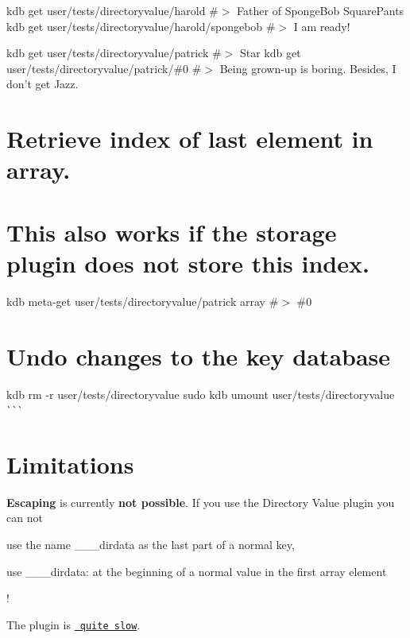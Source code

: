 kdb get user/tests/directoryvalue/harold \#$>$ Father of Sponge\+Bob Square\+Pants kdb get user/tests/directoryvalue/harold/spongebob \#$>$ I am ready!

kdb get user/tests/directoryvalue/patrick \#$>$ Star kdb get user/tests/directoryvalue/patrick/\#0 \#$>$ Being grown-\/up is boring. Besides, I don’t get Jazz.\hypertarget{autotoc_md181_autotoc_md192}{}\section{Retrieve index of last element in array.}\label{autotoc_md181_autotoc_md192}
\hypertarget{autotoc_md181_autotoc_md193}{}\section{This also works if the storage plugin does not store this index.}\label{autotoc_md181_autotoc_md193}
kdb meta-\/get user/tests/directoryvalue/patrick array \#$>$ \#0\hypertarget{autotoc_md181_autotoc_md194}{}\section{Undo changes to the key database}\label{autotoc_md181_autotoc_md194}
kdb rm -\/r user/tests/directoryvalue sudo kdb umount user/tests/directoryvalue \`{}\`{}\`{}\hypertarget{autotoc_md181_autotoc_md195}{}\section{Limitations}\label{autotoc_md181_autotoc_md195}

\begin{DoxyItemize}
\item {\bfseries{Escaping}} is currently {\bfseries{not possible}}. If you use the Directory Value plugin you can not
\begin{DoxyItemize}
\item use the name {\ttfamily \+\_\+\+\_\+\+\_\+dirdata} as the last part of a normal key,
\item use {\ttfamily \+\_\+\+\_\+\+\_\+dirdata\+:} at the beginning of a normal value in the first array element
\end{DoxyItemize}

!
\item The plugin is \href{https://issues.libelektra.org/2281}{\texttt{ quite slow}}. 
\end{DoxyItemize}